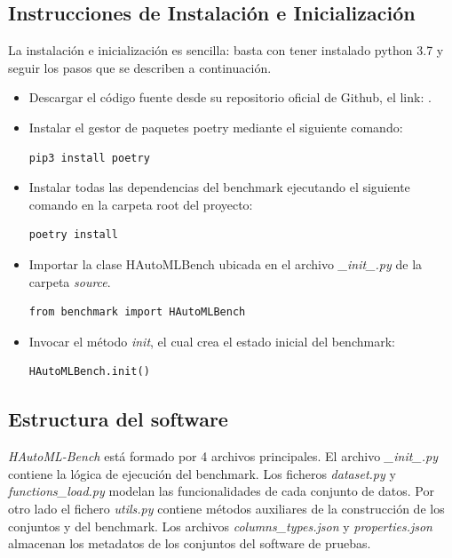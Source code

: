 \subsection{Instrucciones de Instalación e Inicialización}\label{subsection:instructions}
La instalación e inicialización es sencilla: basta con tener instalado python 3.7 y seguir los pasos que se describen a continuación.
\begin{itemize}
\item Descargar el código fuente desde su repositorio oficial de Github, el link: . 
\item Instalar el gestor de paquetes poetry mediante el siguiente comando:
\begin{lstlisting}[language = bash, caption= Instalar poetry]
pip3 install poetry
\end{lstlisting}   

\item Instalar todas las dependencias del benchmark ejecutando el siguiente comando en la carpeta root del proyecto: 
\begin{lstlisting}[language = bash, caption= Instalar dependencias]
poetry install
\end{lstlisting}  

\item Importar la clase HAutoMLBench ubicada en el archivo \textit{\_init\_.py} de la carpeta \textit{source}.
\begin{lstlisting}[caption= Importar HAutoMLBench,label = code:import]
from benchmark import HAutoMLBench
\end{lstlisting}

\item Invocar el método \textit{init}, el cual crea el estado inicial del benchmark: 
\begin{lstlisting}[caption= Invocar init ,label = code:init]
HAutoMLBench.init()
\end{lstlisting}

\end{itemize}

\subsection{Estructura del software}\label{subsection:struct}


\textit{HAutoML-Bench} está formado por 4 archivos principales. El archivo \newline \textit{\_init\_.py} contiene la lógica de ejecución del benchmark.
Los ficheros \textit{dataset.py} y \textit{functions\_load.py} modelan las funcionalidades de cada conjunto de datos. Por otro lado el fichero \textit{utils.py} 
contiene métodos auxiliares de la construcción de los conjuntos y del benchmark. 
Los archivos \textit{columns\_types.json} y \textit{properties.json} almacenan los metadatos de los conjuntos del software de pruebas. 
 
